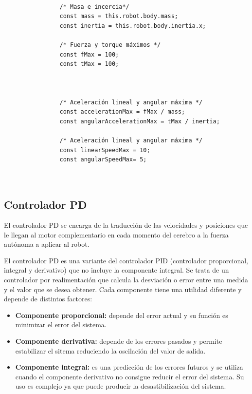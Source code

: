 \small
\begin{verbatim}

                /* Masa e incercia*/
                const mass = this.robot.body.mass;
                const inertia = this.robot.body.inertia.x;
                
                /* Fuerza y torque máximos */
                const fMax = 100;
                const tMax = 100;
                    
                    
                    
                /* Aceleración lineal y angular máxima */
                const accelerationMax = fMax / mass;
                const angularAccelerationMax = tMax / inertia;
                
                /* Aceleración lineal y angular máxima */
                const linearSpeedMax = 10;
                const angularSpeedMax= 5; 
                
                
\end{verbatim}



\subsection{Controlador PD}
\normalsize
El controlador PD se encarga de la traducción de las velocidades y posiciones que le llegan al motor complementario en cada momento del cerebro a la fuerza autónoma a aplicar al robot. \newline

El controlador PD es una variante del controlador PID (controlador proporcional, integral y derivativo) que no incluye la componente integral. Se trata de un controlador por realimentación que calcula la desviación o error entre una medida y el valor que se desea obtener. Cada componente tiene una utilidad diferente y depende de distintos factores:
\begin{itemize}
    \item \textbf{Componente proporcional: }depende del error actual y su función es minimizar el error del sistema.
    \item \textbf{Componente derivativa: }depende de los errores pasados y permite estabilizar el sitema reduciendo la oscilación del valor de salida.
    \item \textbf{Componente integral: }es una predicción de los errores futuros y se utiliza cuando el componente derivativo no consigue reducir el error del sistema. Su uso es complejo ya que puede producir la desastibilización del sistema.
\end{itemize}

